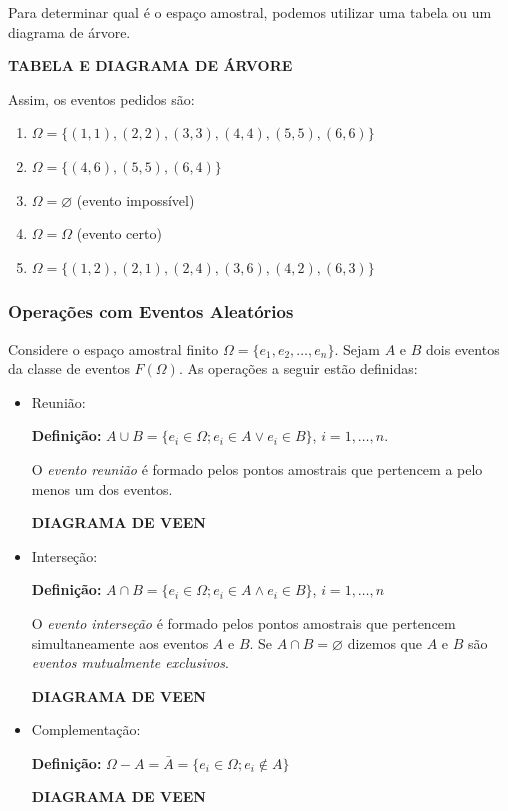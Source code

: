 \documentclass[oneside,a4paper,12pt]{article}
\begin{document}
Para determinar qual é o espaço amostral, podemos utilizar uma tabela ou um diagrama de árvore.

\begin{center}
	{\bf TABELA E DIAGRAMA DE ÁRVORE}
\end{center}

Assim, os eventos pedidos são:
\begin{enumerate}
	\item $\Omega = \{ (1,1), (2,2), (3,3), (4,4), (5,5), (6,6) \}$
	\item $\Omega = \{ (4,6), (5,5), (6,4) \}$
	\item $\Omega = \varnothing$ (evento impossível)
	\item $\Omega = \Omega$ (evento certo)
	\item $\Omega = \{ (1,2), (2,1), (2,4), (3,6), (4,2), (6,3) \}$
\end{enumerate}

\subsubsection{Operações com Eventos Aleatórios}

Considere o espaço amostral finito $\Omega = \{ e_1, e_2, \dots, e_n \}$. Sejam $A$ e $B$ dois eventos da classe de eventos $F(\Omega)$. As operações a seguir estão definidas:

\begin{itemize}
	\item Reunião:
	
	{\bf Definição:} $A \cup B = \{ e_i \in \Omega; e_i \in A \lor e_i \in B \}$, $i = 1,\dots,n$.
	
	O {\it evento reunião} é formado pelos pontos amostrais que pertencem a pelo menos um dos eventos.
	
	\begin{center}
		{\bf DIAGRAMA DE VEEN}
	\end{center}
	
	\item Interseção:
	
	{\bf Definição:} $A \cap B = \{ e_i \in \Omega; e_i \in A \land e_i \in B \}$, $i = 1,\dots,n$
	
	O {\it evento interseção} é formado pelos pontos amostrais que pertencem simultaneamente aos eventos $A$ e $B$. Se $A \cap B = \varnothing$ dizemos que $A$ e $B$ são {\it eventos mutualmente exclusivos}.
	
	\begin{center}
	{\bf DIAGRAMA DE VEEN}
	\end{center}	
	
	\item Complementação:
	
	{\bf Definição:} $\Omega - A = \bar{A} = \{ e_i \in \Omega; e_i \notin A \}$	
	
	\begin{center}
		{\bf DIAGRAMA DE VEEN}
	\end{center}
	
\end{itemize}
\end{document}
